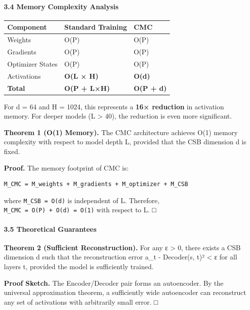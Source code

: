\documentclass[
  11pt,
  a4paper,
]{article}
\begin{document}
\paragraph{3.4 Memory Complexity
Analysis}\label{memory-complexity-analysis}

\begin{longtable}[]{@{}lll@{}}
\toprule\noalign{}
Component & Standard Training & CMC \\
\midrule\noalign{}
\endhead
\bottomrule\noalign{}
\endlastfoot
Weights & O(P) & O(P) \\
Gradients & O(P) & O(P) \\
Optimizer States & O(P) & O(P) \\
Activations & \textbf{O(L × H)} & \textbf{O(d)} \\
\textbf{Total} & \textbf{O(P + L×H)} & \textbf{O(P + d)} \\
\end{longtable}

For d = 64 and H = 1024, this represents a \textbf{16× reduction} in
activation memory. For deeper models (L \textgreater{} 40), the
reduction is even more significant.

\textbf{Theorem 1 (O(1) Memory).} The CMC architecture achieves O(1)
memory complexity with respect to model depth L, provided that the CSB
dimension d is fixed.

\textbf{Proof.} The memory footprint of CMC is:

\begin{verbatim}
M_CMC = M_weights + M_gradients + M_optimizer + M_CSB
\end{verbatim}

where \texttt{M\_CSB\ =\ O(d)} is independent of L. Therefore,
\texttt{M\_CMC\ =\ O(P)\ +\ O(d)\ =\ O(1)} with respect to L. □

\paragraph{3.5 Theoretical Guarantees}\label{theoretical-guarantees-2}

\textbf{Theorem 2 (Sufficient Reconstruction).} For any ε \textgreater{}
0, there exists a CSB dimension d such that the reconstruction error
\textbar\textbar a\_t - Decoder(s, t)\textbar\textbar² \textless{} ε for
all layers t, provided the model is sufficiently trained.

\textbf{Proof Sketch.} The Encoder/Decoder pair forms an autoencoder. By
the universal approximation theorem, a sufficiently wide autoencoder can
reconstruct any set of activations with arbitrarily small error. □
\end{document}
